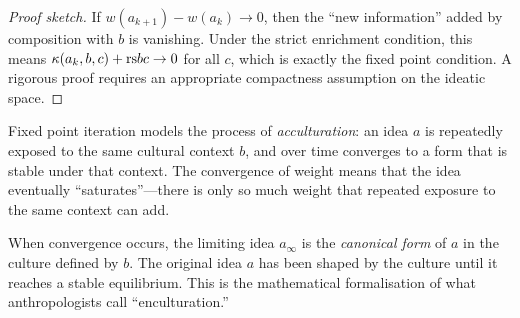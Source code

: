 \begin{proof}[Proof sketch]
If $w(a_{k+1}) - w(a_k) \to 0$, then the ``new information'' added by
composition with $b$ is vanishing.  Under the strict enrichment condition,
this means $\kappa(a_k, b, c) + \mathrm{rs}{b}{c} \to 0$ for all $c$, which is
exactly the fixed point condition.  A rigorous proof requires an appropriate
compactness assumption on the ideatic space.
\end{proof}

\begin{interpretation}
Fixed point iteration models the process of \emph{acculturation}: an idea
$a$ is repeatedly exposed to the same cultural context $b$, and over time
converges to a form that is stable under that context.  The convergence of
weight means that the idea eventually ``saturates''---there is only so much
weight that repeated exposure to the same context can add.

When convergence occurs, the limiting idea $a_{\infty}$ is the
\emph{canonical form} of $a$ in the culture defined by $b$.  The original
idea $a$ has been shaped by the culture until it reaches a stable equilibrium.
This is the mathematical formalisation of what anthropologists call
``enculturation.''
\end{interpretation}

